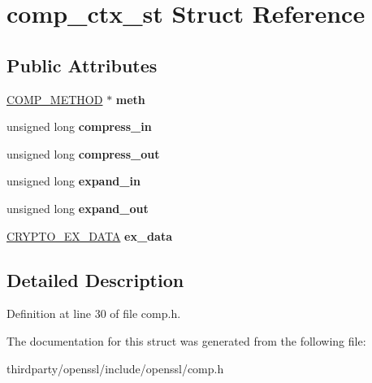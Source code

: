 \hypertarget{structcomp__ctx__st}{}\section{comp\+\_\+ctx\+\_\+st Struct Reference}
\label{structcomp__ctx__st}
\subsection*{Public Attributes}
\begin{DoxyCompactItemize}
\item 
\mbox{\label{structcomp__ctx__st_accd49b9ff8bafe3fa01c8cadc597b855}} 
\hyperlink{structcomp__method__st}{C\+O\+M\+P\+\_\+\+M\+E\+T\+H\+OD} $\ast$ {\bfseries meth}
\item 
\mbox{\label{structcomp__ctx__st_a4a67c3eda213508177bedaaae237f8c4}} 
unsigned long {\bfseries compress\+\_\+in}
\item 
\mbox{\label{structcomp__ctx__st_a4ad823d6c60afbb5d0951f97b3f2e787}} 
unsigned long {\bfseries compress\+\_\+out}
\item 
\mbox{\label{structcomp__ctx__st_a14c4bacc851d14791e566f11624f9a8e}} 
unsigned long {\bfseries expand\+\_\+in}
\item 
\mbox{\label{structcomp__ctx__st_acddf6014a55ffef5a232046f63d4f8a6}} 
unsigned long {\bfseries expand\+\_\+out}
\item 
\mbox{\label{structcomp__ctx__st_ab5069d63997ca03596aeadb5f03f37ec}} 
\hyperlink{structcrypto__ex__data__st}{C\+R\+Y\+P\+T\+O\+\_\+\+E\+X\+\_\+\+D\+A\+TA} {\bfseries ex\+\_\+data}
\end{DoxyCompactItemize}


\subsection{Detailed Description}


Definition at line 30 of file comp.\+h.



The documentation for this struct was generated from the following file\+:\begin{DoxyCompactItemize}
\item 
thirdparty/openssl/include/openssl/comp.\+h\end{DoxyCompactItemize}
